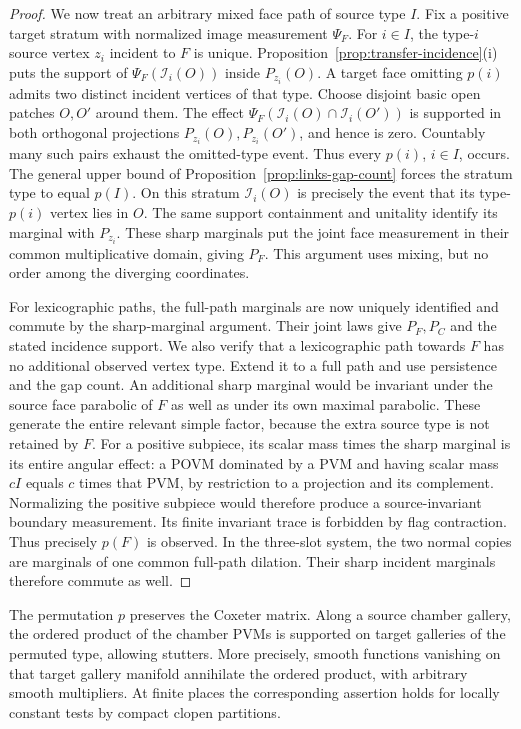 \begin{proof}
We now treat an arbitrary mixed face path of source type $I$.
Fix a positive target stratum with normalized image measurement
$\Psi_F$. For $i\in I$, the type-$i$ source vertex $z_i$ incident
to $F$ is unique. Proposition~\ref{prop:transfer-incidence}\textup{(i)}
puts the support of $\Psi_F(\mathcal I_i(O))$ inside $P_{z_i}(O)$.
A target face omitting $p(i)$ admits two distinct incident vertices
of that type. Choose disjoint basic open patches $O,O'$ around them.
The effect $\Psi_F(\mathcal I_i(O)\cap\mathcal I_i(O'))$ is
supported in both orthogonal projections $P_{z_i}(O),P_{z_i}(O')$,
and hence is zero. Countably many such pairs exhaust the omitted-type
event. Thus every $p(i)$, $i\in I$, occurs. The general upper bound
of Proposition~\ref{prop:links-gap-count} forces the stratum type
to equal $p(I)$. On this stratum $\mathcal I_i(O)$ is precisely
the event that its type-$p(i)$ vertex lies in $O$. The same support
containment and unitality identify its marginal with $P_{z_i}$.
These sharp marginals put the joint face measurement in their
common multiplicative domain, giving $P_F$. This argument uses
mixing, but no order among the diverging coordinates.

For lexicographic paths, the full-path marginals are now uniquely identified and commute by
the sharp-marginal argument. Their joint laws give $P_F,P_C$ and the
stated incidence support. We also verify that a lexicographic path towards $F$ has
no additional observed vertex type. Extend it to a full path and use
persistence and the gap count. An additional sharp marginal would be
invariant under the source face parabolic of $F$ as well as under its
own maximal parabolic. These generate the entire relevant simple
factor, because the extra source type is not retained by $F$.
For a positive subpiece, its scalar mass times the sharp marginal is
its entire angular effect: a POVM dominated by a PVM and having scalar
mass $cI$ equals $c$ times that PVM, by restriction to a projection
and its complement. Normalizing the positive subpiece would therefore
produce a source-invariant boundary measurement. Its finite invariant
trace is forbidden by flag contraction. Thus precisely $p(F)$ is
observed. In the three-slot system, the two normal copies are
marginals of one common full-path dilation. Their sharp incident
marginals therefore commute as well.
\end{proof}

\begin{proposition}
\label{prop:transfer-galleries}
The permutation $p$ preserves the Coxeter matrix. Along a source
chamber gallery, the ordered product of the chamber PVMs is supported
on target galleries of the permuted type, allowing stutters. More
precisely, smooth functions vanishing on that target gallery manifold
annihilate the ordered product, with arbitrary smooth multipliers.
At finite places the corresponding assertion holds for locally
constant tests by compact clopen partitions.
\end{proposition}


